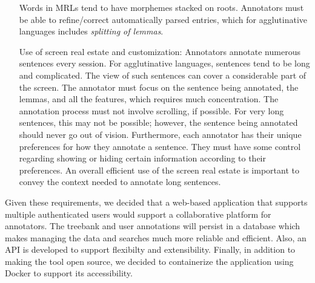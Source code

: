 \begin{itemize}[before=\normalfont, font=\itshape, align=left,noitemsep,topsep=0pt,parsep=0pt,partopsep=0pt,labelsep=3pt,align=left]
        Words in MRLs tend to have morphemes stacked on roots.
        Annotators must be able to refine/correct automatically parsed entries, which for agglutinative languages includes \textit{splitting of lemmas}.
    \item[Use of screen real estate and customization:]
        Annotators annotate numerous sentences every session.
        For agglutinative languages, sentences tend to be long and complicated.
        The view of such sentences can cover a considerable part of the screen.
        The annotator must focus on the sentence being annotated, the lemmas, and all the features, which requires much concentration.
        The annotation process must not involve scrolling, if possible.
        For very long sentences, this may not be possible; however, the sentence being annotated should never go out of vision.
        Furthermore, each annotator has their unique preferences for how they annotate a sentence.
        They must have some control regarding showing or hiding certain information according to their preferences.
        An overall efficient use of the screen real estate is important to convey the context needed to annotate long sentences.
\end{itemize}

Given these requirements, we decided that a web-based application that supports multiple authenticated users would support a collaborative platform for annotators.
The treebank and user annotations will persist in a database which makes managing the data and searches much more reliable and efficient.
Also, an API is developed to support flexibilty and extensibility.
Finally, in addition to making the tool open source, we decided to containerize the application using Docker\cite{docker} to support its accessibility.
